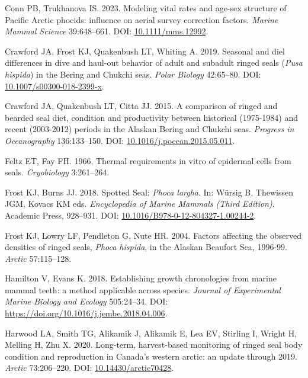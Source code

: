 \documentclass[fleqn,10pt,lineno]{wlpeerj} %
\newlength{\cslhangindent}
\newlength{\cslentryspacingunit} %
\newenvironment{CSLReferences}[2] %
 {%
  \setlength{\parindent}{0pt}
  \ifodd #1
  \let\oldpar\par
  \def\par{\hangindent=\cslhangindent\oldpar}
  \fi
  \setlength{\parskip}{#2\cslentryspacingunit}
 }%
 {}
\begin{document}
\begin{CSLReferences}{1}{0}
\leavevmode{}%
Conn PB, Trukhanova IS. 2023. Modeling vital rates and age-sex structure of Pacific Arctic phocids: influence on aerial survey correction factors. \emph{Marine Mammal Science} 39:648--661. DOI: \href{https://doi.org/10.1111/mms.12992}{10.1111/mms.12992}.

\leavevmode{}%
Crawford JA, Frost KJ, Quakenbush LT, Whiting A. 2019. Seasonal and diel differences in dive and haul-out behavior of adult and subadult ringed seals (\emph{Pusa hispida}) in the Bering and Chukchi seas. \emph{Polar Biology} 42:65--80. DOI: \href{https://doi.org/10.1007/s00300-018-2399-x}{10.1007/s00300-018-2399-x}.

\leavevmode{}%
Crawford JA, Quakenbush LT, Citta JJ. 2015. A comparison of ringed and bearded seal diet, condition and productivity between historical (1975-1984) and recent (2003-2012) periods in the Alaskan Bering and Chukchi seas. \emph{Progress in Oceanography} 136:133--150. DOI: \href{https://doi.org/10.1016/j.pocean.2015.05.011}{10.1016/j.pocean.2015.05.011}.

\leavevmode{}%
Feltz ET, Fay FH. 1966. Thermal requirements in vitro of epidermal cells from seals. \emph{Cryobiology} 3:261--264.

\leavevmode{}%
Frost KJ, Burns JJ. 2018. Spotted Seal: \emph{Phoca largha}. In: Würsig B, Thewissen JGM, Kovacs KM eds. \emph{Encyclopedia of Marine Mammals (Third Edition)}. Academic Press, 928--931. DOI: \href{https://doi.org/10.1016/B978-0-12-804327-1.00244-2}{10.1016/B978-0-12-804327-1.00244-2}.

\leavevmode{}%
Frost KJ, Lowry LF, Pendleton G, Nute HR. 2004. Factors affecting the observed densities of ringed seals, \emph{Phoca hispida}, in the Alaskan Beaufort Sea, 1996-99. \emph{Arctic} 57:115--128.

\leavevmode{}%
Hamilton V, Evans K. 2018. Establishing growth chronologies from marine mammal teeth: a method applicable across species. \emph{Journal of Experimental Marine Biology and Ecology} 505:24--34. DOI: \url{https://doi.org/10.1016/j.jembe.2018.04.006}.

\leavevmode{}%
Harwood LA, Smith TG, Alikamik J, Alikamik E, Lea EV, Stirling I, Wright H, Melling H, Zhu X. 2020. Long-term, harvest-based monitoring of ringed seal body condition and reproduction in Canada's western arctic: an update through 2019. \emph{Arctic} 73:206--220. DOI: \href{https://doi.org/10.14430/arctic70428}{10.14430/arctic70428}.


\end{CSLReferences}
\end{document}
